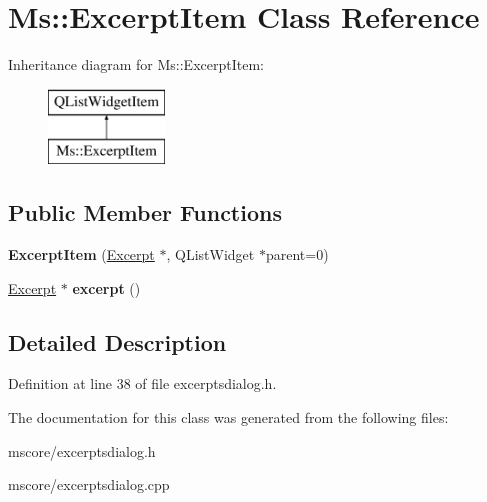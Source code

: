 \hypertarget{class_ms_1_1_excerpt_item}{}\section{Ms\+:\+:Excerpt\+Item Class Reference}
\label{class_ms_1_1_excerpt_item}
Inheritance diagram for Ms\+:\+:Excerpt\+Item\+:\begin{figure}[H]
\begin{center}
\leavevmode
\includegraphics[height=2.000000cm]{class_ms_1_1_excerpt_item}
\end{center}
\end{figure}
\subsection*{Public Member Functions}
\begin{DoxyCompactItemize}
\item 
\mbox{\label{class_ms_1_1_excerpt_item_a31219a846c3b9313b7ee540a91db08c6}} 
{\bfseries Excerpt\+Item} (\hyperlink{class_ms_1_1_excerpt}{Excerpt} $\ast$, Q\+List\+Widget $\ast$parent=0)
\item 
\mbox{\label{class_ms_1_1_excerpt_item_a1da3071a81f873726affc4579bf9a0f8}} 
\hyperlink{class_ms_1_1_excerpt}{Excerpt} $\ast$ {\bfseries excerpt} ()
\end{DoxyCompactItemize}


\subsection{Detailed Description}


Definition at line 38 of file excerptsdialog.\+h.



The documentation for this class was generated from the following files\+:\begin{DoxyCompactItemize}
\item 
mscore/excerptsdialog.\+h\item 
mscore/excerptsdialog.\+cpp\end{DoxyCompactItemize}
